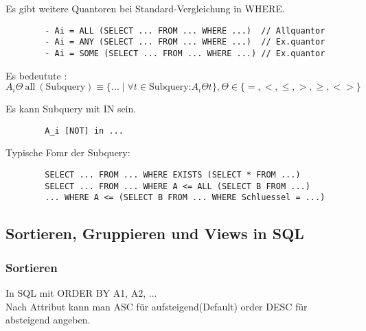 \begin{remark}
    Es gibt weitere Quantoren bei Standard-Vergleichung in WHERE.
    \begin{verbatim}
        - Ai = ALL (SELECT ... FROM ... WHERE ...)  // Allquantor
        - Ai = ANY (SELECT ... FROM ... WHERE ...)  // Ex.quantor
        - Ai = SOME (SELECT ... FROM ... WHERE ...) // Ex.quantor
    \end{verbatim}
    Es bedeutute :\(A_i \Theta \  \text{all}\ (\text{Subquery})\equiv \{...\mid \forall t \in \text{Subquery:}A_i \Theta t\}, \Theta\in\{=,<,\leq,>,\geq,<>\}\)
\end{remark}

\begin{remark}
    Es kann Subquery mit IN sein.
    \begin{verbatim}
        A_i [NOT] in ...
    \end{verbatim}
\end{remark}

\begin{example}Typische Fomr der Subquery:
    \begin{verbatim}
        SELECT ... FROM ... WHERE EXISTS (SELECT * FROM ...)
        SELECT ... FROM ... WHERE A <= ALL (SELECT B FROM ...)
        ... WHERE A <= (SELECT B FROM ... WHERE Schluessel = ...)
    \end{verbatim}
\end{example}

\subsection{Sortieren, Gruppieren und Views in SQL}
\subsubsection{Sortieren}
In SQL mit ORDER BY A1, A2, ...\\
Nach Attribut kann man ASC f\"ur aufsteigend(Default) order DESC f\"ur absteigend angeben.
